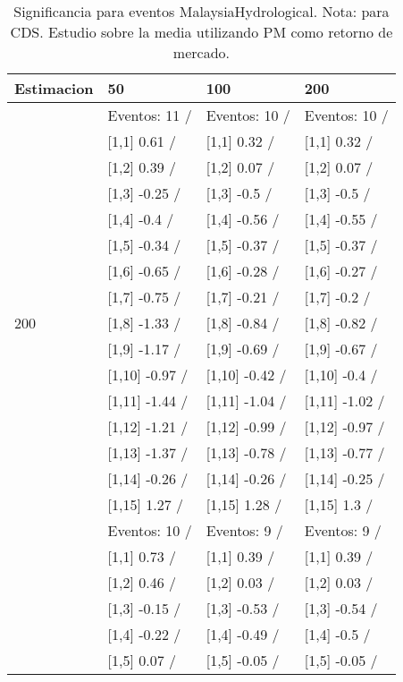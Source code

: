 \begin{table}

\caption{Significancia para eventos MalaysiaHydrological. Nota: para CDS. Estudio sobre la media utilizando PM como retorno de mercado.}
\centering
\begin{tabular}[t]{llll}
\toprule
Estimacion & 50 & 100 & 200\\
\midrule
 & Eventos:  11 / & Eventos:  10 / & Eventos:  10 /\\
 & {}[1,1] 0.61  / & {}[1,1] 0.32  / & {}[1,1] 0.32  /\\
 & {}[1,2] 0.39  / & {}[1,2] 0.07  / & {}[1,2] 0.07  /\\
 & {}[1,3] -0.25  / & {}[1,3] -0.5  / & {}[1,3] -0.5  /\\
 & {}[1,4] -0.4  / & {}[1,4] -0.56  / & {}[1,4] -0.55  /\\
\addlinespace
 & {}[1,5] -0.34  / & {}[1,5] -0.37  / & {}[1,5] -0.37  /\\
 & {}[1,6] -0.65  / & {}[1,6] -0.28  / & {}[1,6] -0.27  /\\
 & {}[1,7] -0.75  / & {}[1,7] -0.21  / & {}[1,7] -0.2  /\\
200 & {}[1,8] -1.33  / & {}[1,8] -0.84  / & {}[1,8] -0.82  /\\
 & {}[1,9] -1.17  / & {}[1,9] -0.69  / & {}[1,9] -0.67  /\\
\addlinespace
 & {}[1,10] -0.97  / & {}[1,10] -0.42  / & {}[1,10] -0.4  /\\
 & {}[1,11] -1.44  / & {}[1,11] -1.04  / & {}[1,11] -1.02  /\\
 & {}[1,12] -1.21  / & {}[1,12] -0.99  / & {}[1,12] -0.97  /\\
 & {}[1,13] -1.37  / & {}[1,13] -0.78  / & {}[1,13] -0.77  /\\
 & {}[1,14] -0.26  / & {}[1,14] -0.26  / & {}[1,14] -0.25  /\\
\addlinespace
 & {}[1,15] 1.27  / & {}[1,15] 1.28  / & {}[1,15] 1.3  /\\
 & Eventos:  10 / & Eventos:  9 / & Eventos:  9 /\\
 & {}[1,1] 0.73  / & {}[1,1] 0.39  / & {}[1,1] 0.39  /\\
 & {}[1,2] 0.46  / & {}[1,2] 0.03  / & {}[1,2] 0.03  /\\
 & {}[1,3] -0.15  / & {}[1,3] -0.53  / & {}[1,3] -0.54  /\\
\addlinespace
 & {}[1,4] -0.22  / & {}[1,4] -0.49  / & {}[1,4] -0.5  /\\
 & {}[1,5] 0.07  / & {}[1,5] -0.05  / & {}[1,5] -0.05  /\\

\end{tabular}
\end{table}
